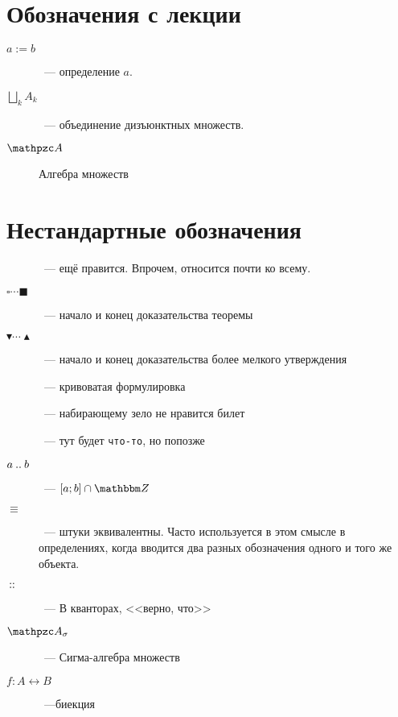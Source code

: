 \documentclass[12pt,timbord]{longnotes}
\begin{document}
\section*{Обозначения с лекции}
\begin{description}
  \item[$a:= b$]~--- определение $a$.
  \item[$\displaystyle \bigsqcup_k A_k$]~--- объединение дизъюнктных множеств.
  \item[$\alg$] Алгебра множеств
\end{description}

\section*{Нестандартные обозначения}

\begin{description}
  \item[\underdev]~--- ещё правится. Впрочем, относится почти ко всему.
  \item[$\square\cdots\blacksquare$]~--- начало и конец доказательства теоремы
  \item[$\blacktriangledown\cdots\blacktriangle$]~--- начало и конец доказательства более мелкого 
    утверждения
  \item[\sour]~--- кривоватая формулировка
  \item[\flame]~--- набирающему зело не нравится билет
  \item[]~--- тут будет \texttt{что-то}, но попозже
  \item[$a\mathbin{..} b$]~--- $[a;b]\cap \Z$
  \item[$\equiv$]~--- штуки эквивалентны. Часто используется в этом смысле в
    определениях, когда вводится два разных обозначения одного и того же
    объекта.
  \item[$\:::\:$]~--- В кванторах, <<верно, что>>
  \item[$\alg_\sigma$]~--- Сигма-алгебра множеств
  \item[$f \colon A \leftrightarrow B$]~---биекция
\end{description}
\end{document}
